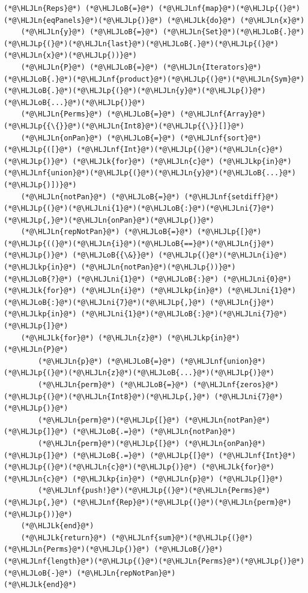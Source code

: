 \documentclass[12pt,a4paper]{article}
\newcommand{\HLJLk}[1]{\textcolor[RGB]{148,91,176}{\textbf{#1}}}
\newcommand{\HLJLkp}[1]{\textcolor[RGB]{148,91,176}{\textbf{#1}}}
\newcommand{\HLJLn}[1]{#1}
\newcommand{\HLJLnf}[1]{\textcolor[RGB]{66,102,213}{#1}}
\newcommand{\HLJLni}[1]{\textcolor[RGB]{59,151,46}{#1}}
\newcommand{\HLJLoB}[1]{\textcolor[RGB]{102,102,102}{\textbf{#1}}}
\newcommand{\HLJLp}[1]{#1}
\begin{document}
\begin{lstlisting}
(*@\HLJLn{Reps}@*) (*@\HLJLoB{=}@*) (*@\HLJLnf{map}@*)(*@\HLJLp{(}@*)(*@\HLJLn{eqPanels}@*)(*@\HLJLp{)}@*) (*@\HLJLk{do}@*) (*@\HLJLn{x}@*)
	(*@\HLJLn{y}@*) (*@\HLJLoB{=}@*) (*@\HLJLn{Set}@*)(*@\HLJLoB{.}@*)(*@\HLJLp{(}@*)(*@\HLJLn{last}@*)(*@\HLJLoB{.}@*)(*@\HLJLp{(}@*)(*@\HLJLn{x}@*)(*@\HLJLp{))}@*)
	(*@\HLJLn{P}@*) (*@\HLJLoB{=}@*) (*@\HLJLn{Iterators}@*)(*@\HLJLoB{.}@*)(*@\HLJLnf{product}@*)(*@\HLJLp{(}@*)(*@\HLJLn{Sym}@*)(*@\HLJLoB{.}@*)(*@\HLJLp{(}@*)(*@\HLJLn{y}@*)(*@\HLJLp{)}@*)(*@\HLJLoB{...}@*)(*@\HLJLp{)}@*)
	(*@\HLJLn{Perms}@*) (*@\HLJLoB{=}@*) (*@\HLJLnf{Array}@*)(*@\HLJLp{{\{}}@*)(*@\HLJLn{Int8}@*)(*@\HLJLp{{\}}[]}@*)
	(*@\HLJLn{onPan}@*) (*@\HLJLoB{=}@*) (*@\HLJLnf{sort}@*)(*@\HLJLp{([}@*) (*@\HLJLnf{Int}@*)(*@\HLJLp{(}@*)(*@\HLJLn{c}@*)(*@\HLJLp{)}@*) (*@\HLJLk{for}@*) (*@\HLJLn{c}@*) (*@\HLJLkp{in}@*) (*@\HLJLnf{union}@*)(*@\HLJLp{(}@*)(*@\HLJLn{y}@*)(*@\HLJLoB{...}@*)(*@\HLJLp{)])}@*)
	(*@\HLJLn{notPan}@*) (*@\HLJLoB{=}@*) (*@\HLJLnf{setdiff}@*)(*@\HLJLp{(}@*)(*@\HLJLni{1}@*)(*@\HLJLoB{:}@*)(*@\HLJLni{7}@*)(*@\HLJLp{,}@*)(*@\HLJLn{onPan}@*)(*@\HLJLp{)}@*)
	(*@\HLJLn{repNotPan}@*) (*@\HLJLoB{=}@*) (*@\HLJLp{[}@*) (*@\HLJLp{((}@*)(*@\HLJLn{i}@*)(*@\HLJLoB{==}@*)(*@\HLJLn{j}@*)(*@\HLJLp{)}@*) (*@\HLJLoB{{\&}}@*) (*@\HLJLp{(}@*)(*@\HLJLn{i}@*) (*@\HLJLkp{in}@*) (*@\HLJLn{notPan}@*)(*@\HLJLp{))}@*) (*@\HLJLoB{?}@*) (*@\HLJLni{1}@*) (*@\HLJLoB{:}@*) (*@\HLJLni{0}@*) (*@\HLJLk{for}@*) (*@\HLJLn{i}@*) (*@\HLJLkp{in}@*) (*@\HLJLni{1}@*)(*@\HLJLoB{:}@*)(*@\HLJLni{7}@*)(*@\HLJLp{,}@*) (*@\HLJLn{j}@*) (*@\HLJLkp{in}@*) (*@\HLJLni{1}@*)(*@\HLJLoB{:}@*)(*@\HLJLni{7}@*)(*@\HLJLp{]}@*)
	(*@\HLJLk{for}@*) (*@\HLJLn{z}@*) (*@\HLJLkp{in}@*) (*@\HLJLn{P}@*)
		(*@\HLJLn{p}@*) (*@\HLJLoB{=}@*) (*@\HLJLnf{union}@*)(*@\HLJLp{(}@*)(*@\HLJLn{z}@*)(*@\HLJLoB{...}@*)(*@\HLJLp{)}@*)
		(*@\HLJLn{perm}@*) (*@\HLJLoB{=}@*) (*@\HLJLnf{zeros}@*)(*@\HLJLp{(}@*)(*@\HLJLn{Int8}@*)(*@\HLJLp{,}@*) (*@\HLJLni{7}@*)(*@\HLJLp{)}@*)
		(*@\HLJLn{perm}@*)(*@\HLJLp{[}@*) (*@\HLJLn{notPan}@*)(*@\HLJLp{]}@*) (*@\HLJLoB{.=}@*) (*@\HLJLn{notPan}@*)
		(*@\HLJLn{perm}@*)(*@\HLJLp{[}@*) (*@\HLJLn{onPan}@*) (*@\HLJLp{]}@*) (*@\HLJLoB{.=}@*) (*@\HLJLp{[}@*) (*@\HLJLnf{Int}@*)(*@\HLJLp{(}@*)(*@\HLJLn{c}@*)(*@\HLJLp{)}@*) (*@\HLJLk{for}@*) (*@\HLJLn{c}@*) (*@\HLJLkp{in}@*) (*@\HLJLn{p}@*) (*@\HLJLp{]}@*)
		(*@\HLJLnf{push!}@*)(*@\HLJLp{(}@*)(*@\HLJLn{Perms}@*)(*@\HLJLp{,}@*) (*@\HLJLnf{Rep}@*)(*@\HLJLp{(}@*)(*@\HLJLn{perm}@*)(*@\HLJLp{))}@*)
	(*@\HLJLk{end}@*)
	(*@\HLJLk{return}@*) (*@\HLJLnf{sum}@*)(*@\HLJLp{(}@*)(*@\HLJLn{Perms}@*)(*@\HLJLp{)}@*) (*@\HLJLoB{/}@*) (*@\HLJLnf{length}@*)(*@\HLJLp{(}@*)(*@\HLJLn{Perms}@*)(*@\HLJLp{)}@*) (*@\HLJLoB{-}@*) (*@\HLJLn{repNotPan}@*)
(*@\HLJLk{end}@*)


\end{lstlisting}
\end{document}

